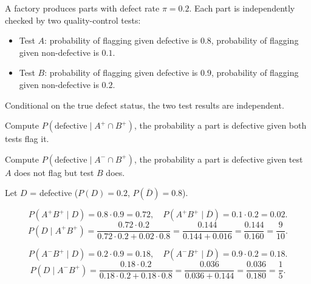 \documentclass[test,letterpaper]{cs20}
\begin{document}
\begin{problem}

A factory produces parts with defect rate $\pi = 0.2$. Each part is independently checked by two quality-control tests:
\begin{itemize}
\item Test $A$: probability of flagging given defective is $0.8$, probability of flagging given non-defective is $0.1$.
\item Test $B$: probability of flagging given defective is $0.9$, probability of flagging given non-defective is $0.2$.
\end{itemize}
Conditional on the true defect status, the two test results are independent.

\subproblem Compute $P(\text{defective} \mid A^+ \cap B^+)$, the probability a part is defective given both tests flag it.

\subproblem Compute $P(\text{defective} \mid A^- \cap B^+)$, the probability a part is defective given test $A$ does not flag but test $B$ does.

\begin{solution}
Let $D$ = defective ($P(D) = 0.2$, $P(\overline{D}) = 0.8$).

\subsolution
\[
P(A^+ B^+ \mid D) = 0.8 \cdot 0.9 = 0.72, \quad P(A^+ B^+ \mid \overline{D}) = 0.1 \cdot 0.2 = 0.02.
\]
\[
P(D \mid A^+ B^+) = \frac{0.72 \cdot 0.2}{0.72 \cdot 0.2 + 0.02 \cdot 0.8} = \frac{0.144}{0.144 + 0.016} = \frac{0.144}{0.160} = \frac{9}{10}.
\]

\subsolution
\[
P(A^- B^+ \mid D) = 0.2 \cdot 0.9 = 0.18, \quad P(A^- B^+ \mid \overline{D}) = 0.9 \cdot 0.2 = 0.18.
\]
\[
P(D \mid A^- B^+) = \frac{0.18 \cdot 0.2}{0.18 \cdot 0.2 + 0.18 \cdot 0.8} = \frac{0.036}{0.036 + 0.144} = \frac{0.036}{0.180} = \frac{1}{5}.
\]
\end{solution}

\pagebreak

\end{problem}
\end{document}
